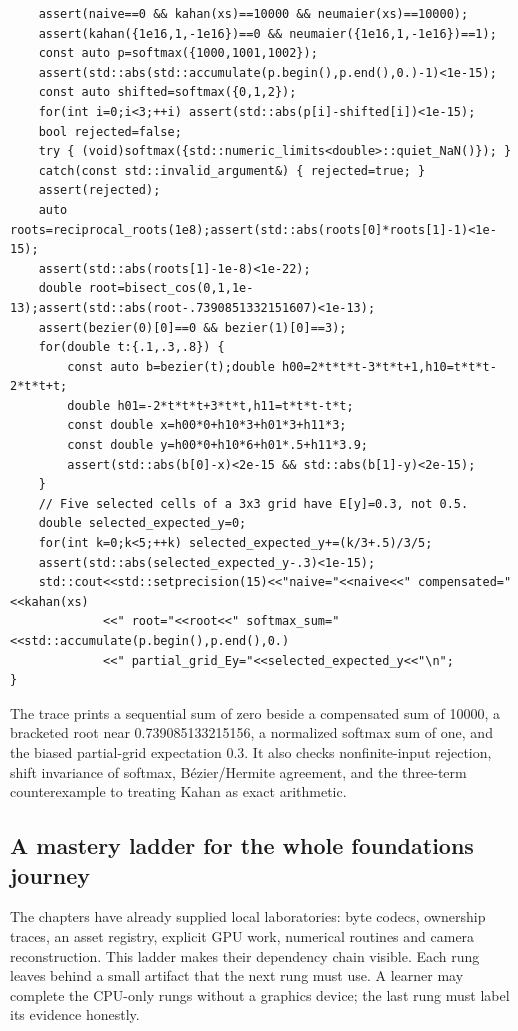 \begin{verbatim}
    assert(naive==0 && kahan(xs)==10000 && neumaier(xs)==10000);
    assert(kahan({1e16,1,-1e16})==0 && neumaier({1e16,1,-1e16})==1);
    const auto p=softmax({1000,1001,1002});
    assert(std::abs(std::accumulate(p.begin(),p.end(),0.)-1)<1e-15);
    const auto shifted=softmax({0,1,2});
    for(int i=0;i<3;++i) assert(std::abs(p[i]-shifted[i])<1e-15);
    bool rejected=false;
    try { (void)softmax({std::numeric_limits<double>::quiet_NaN()}); }
    catch(const std::invalid_argument&) { rejected=true; }
    assert(rejected);
    auto roots=reciprocal_roots(1e8);assert(std::abs(roots[0]*roots[1]-1)<1e-15);
    assert(std::abs(roots[1]-1e-8)<1e-22);
    double root=bisect_cos(0,1,1e-13);assert(std::abs(root-.7390851332151607)<1e-13);
    assert(bezier(0)[0]==0 && bezier(1)[0]==3);
    for(double t:{.1,.3,.8}) {
        const auto b=bezier(t);double h00=2*t*t*t-3*t*t+1,h10=t*t*t-2*t*t+t;
        double h01=-2*t*t*t+3*t*t,h11=t*t*t-t*t;
        const double x=h00*0+h10*3+h01*3+h11*3;
        const double y=h00*0+h10*6+h01*.5+h11*3.9;
        assert(std::abs(b[0]-x)<2e-15 && std::abs(b[1]-y)<2e-15);
    }
    // Five selected cells of a 3x3 grid have E[y]=0.3, not 0.5.
    double selected_expected_y=0;
    for(int k=0;k<5;++k) selected_expected_y+=(k/3+.5)/3/5;
    assert(std::abs(selected_expected_y-.3)<1e-15);
    std::cout<<std::setprecision(15)<<"naive="<<naive<<" compensated="<<kahan(xs)
             <<" root="<<root<<" softmax_sum="<<std::accumulate(p.begin(),p.end(),0.)
             <<" partial_grid_Ey="<<selected_expected_y<<"\n";
}
\end{verbatim}

The trace prints a sequential sum of zero beside a compensated sum of 10000, a bracketed root near 0.739085133215156, a normalized softmax sum of one, and the biased partial-grid expectation 0.3. It also checks nonfinite-input rejection, shift invariance of softmax, Bézier/Hermite agreement, and the three-term counterexample to treating Kahan as exact arithmetic.

\subsection{A mastery ladder for the whole foundations journey}\label{a-mastery-ladder-for-the-whole-foundations-journey}

The chapters have already supplied local laboratories: byte codecs, ownership traces, an asset registry, explicit GPU work, numerical routines and camera reconstruction. This ladder makes their dependency chain visible. Each rung leaves behind a small artifact that the next rung must use. A learner may complete the CPU-only rungs without a graphics device; the last rung must label its evidence honestly.

